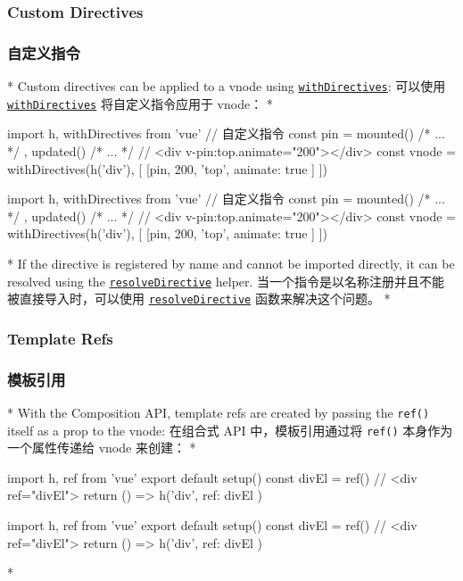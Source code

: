\begin{paracol}{2}
\subsubsection{Custom Directives}
\switchcolumn
\subsubsection{自定义指令}
\switchcolumn[0]*%
Custom directives can be applied to a vnode using
\href{https://vuejs.org/api/render-function.html\#withdirectives}{\texttt{withDirectives}}:
\switchcolumn
可以使用
\href{https://cn.vuejs.org/api/render-function.html\#withdirectives}{\texttt{withDirectives}}
将自定义指令应用于 vnode：
\switchcolumn[0]*%
\begin{codeJs}
import { h, withDirectives } from 'vue'
// 自定义指令
const pin = {
  mounted() { /* ... */ },
  updated() { /* ... */ }
}
// <div v-pin:top.animate="200"></div>
const vnode = withDirectives(h('div'), [
  [pin, 200, 'top', { animate: true }]
])
\end{codeJs}
\switchcolumn
\begin{codeJs}
import { h, withDirectives } from 'vue'
// 自定义指令
const pin = {
  mounted() { /* ... */ },
  updated() { /* ... */ }
}
// <div v-pin:top.animate="200"></div>
const vnode = withDirectives(h('div'), [
  [pin, 200, 'top', { animate: true }]
])
\end{codeJs}
\switchcolumn[0]*%
If the directive is registered by name and cannot be imported directly,
it can be resolved using the
\href{https://vuejs.org/api/render-function.html\#resolvedirective}{\texttt{resolveDirective}}
helper.
\switchcolumn
当一个指令是以名称注册并且不能被直接导入时，可以使用
\href{https://cn.vuejs.org/api/render-function.html\#resolvedirective}{\texttt{resolveDirective}}
函数来解决这个问题。
\switchcolumn[0]*%
\subsubsection{Template Refs}
\switchcolumn
\subsubsection{模板引用}
\switchcolumn[0]*%
With the Composition API, template refs are created by passing the
\texttt{ref()} itself as a prop to the vnode:
\switchcolumn
在组合式 API 中，模板引用通过将 \texttt{ref()} 本身作为一个属性传递给
vnode 来创建：
\switchcolumn[0]*%
\begin{codeJs}
import { h, ref } from 'vue'
export default {
  setup() {
    const divEl = ref()
    // <div ref="divEl">
    return () => h('div', { ref: divEl })
  }
}
\end{codeJs}
\switchcolumn
\begin{codeJs}
import { h, ref } from 'vue'
export default {
  setup() {
    const divEl = ref()
    // <div ref="divEl">
    return () => h('div', { ref: divEl })
  }
}
\end{codeJs}
\switchcolumn[0]*%

\end{paracol}
